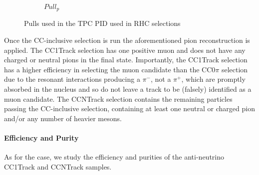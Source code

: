 \begin{figure}[h]
\begin{subfigure}[t]{0.32\textwidth}
		\caption{$Pull_p$}
	\end{subfigure}
	\caption{Pulls used in the TPC PID used in \numubar RHC selections}
	\label{fig:numubar_pulls}
\end{figure}

Once the \numubar CC-inclusive selection is run the aforementioned pion reconstruction is applied. The \numubar CC1Track selection has one positive muon and does not have any charged or neutral pions in the final state. Importantly, the \numubar CC1Track selection has a higher efficiency in selecting the muon candidate than the \numu CC0$\pi$ selection due to the \numubar resonant interactions producing a $\pi^-$, not a $\pi^+$, which are promptly absorbed in the nucleus and so do not leave a track to be (falsely) identified as a muon candidate. The \numubar CCNTrack selection contains the remaining particles passing the \numubar CC-inclusive selection, containing at least one neutral or charged pion and/or any number of heavier mesons.

\paragraph{Efficiency and Purity}
As for the \numu case, we study the efficiency and purities of the anti-neutrino CC1Track and CCNTrack samples.

